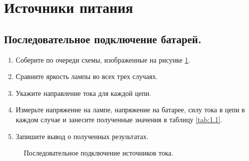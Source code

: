 \newpage
\section{Источники питания}


\subsection{Последовательное подключение батарей.}

\begin{enumerate}
    \item Соберите по очереди схемы, изображенные на рисунке \ref{ris:image1}.
    \item Сравните яркость лампы во всех трех случаях.
    \item Укажите направление тока для каждой цепи.
    \item Измерьте напряжение на лампе, напряжение на батарее, силу тока в цепи в каждом случае и занесите полученные значения в таблицу \ref{tab:1.1}.
    \item Запишите вывод о полученных результатах.
\end{enumerate}

\begin{figure}[ht]
\begin{minipage}[h]{0.3\linewidth}
\end{minipage}
\hfill
\begin{minipage}[h]{0.3\linewidth}
\end{minipage}
\hfill
\begin{minipage}[h]{0.3\linewidth}
\end{minipage}
\caption{Последовательное подключение источников тока.}
\label{ris:image1}
\end{figure}

